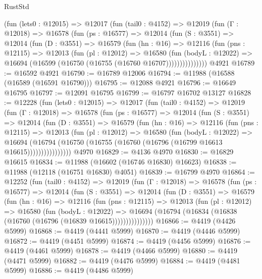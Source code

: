 \begin{lexlean}{RustStd}
\begin{coremodule}
      (fun (lets0 : @12015) =>
      @12017
        (fun (tail0 : @4152) =>
        @12019
          (fun (Γ : @12018) =>
          @16578
            (fun (ps : @16577) =>
            @12014
              (fun (S : @3551) =>
              @12014
                (fun (D : @3551) =>
                @16579
                  (fun (hn : @16) =>
                  @12116
                    (fun (pns : @12115) =>
                    @12013
                      (fun (pl : @12012) =>
                      @16580
                        (fun (bodyL : @12022) =>
                        @16694 (@16599 (@16750 (@16755 (@16760 @16707)))))))))))))))
    @4921
@16789 := @16592 @4921
@16790 := @16789 @12006
@16794 := @11988 (@16588 (@16589 (@16591 @16790)))
@16795 := @12088 @4921
@16796 := @16649 @16795
@16797 := @12091 @16795
@16799 := @16797 @16702 @13127
@16828 := @12228
    (fun (lets0 : @12015) =>
    @12017
      (fun (tail0 : @4152) =>
      @12019
        (fun (Γ : @12018) =>
        @16578
          (fun (ps : @16577) =>
          @12014
            (fun (S : @3551) =>
            @12014
              (fun (D : @3551) =>
              @16579
                (fun (hn : @16) =>
                @12116
                  (fun (pns : @12115) =>
                  @12013
                    (fun (pl : @12012) =>
                    @16580
                      (fun (bodyL : @12022) =>
                      @16694
                        (@16794
                          (@16750 (@16755 (@16760 (@16796 (@16799 @16613 @16615))))))))))))))))
    @4970
@16829 := @4136 @4970
@16830 := @16829 @16615
@16834 := @11988 (@16602 (@16746 @16830) @16623)
@16838 := @11988 (@12118 (@16751 @16830) @4051)
@16839 := @16799 @4970
@16864 := @12252
    (fun (tail0 : @4152) =>
    @12019
      (fun (Γ : @12018) =>
      @16578
        (fun (ps : @16577) =>
        @12014
          (fun (S : @3551) =>
          @12014
            (fun (D : @3551) =>
            @16579
              (fun (hn : @16) =>
              @12116
                (fun (pns : @12115) =>
                @12013
                  (fun (pl : @12012) =>
                  @16580
                    (fun (bodyL : @12022) =>
                    @16694 (@16794 (@16834 (@16838 (@16760 (@16796 (@16839 @16615)))))))))))))))
@16866 := @4419 (@4426 @5999)
@16868 := @4419 (@4441 @5999)
@16870 := @4419 (@4446 @5999)
@16872 := @4419 (@4451 @5999)
@16874 := @4419 (@4456 @5999)
@16876 := @4419 (@4461 @5999)
@16878 := @4419 (@4466 @5999)
@16880 := @4419 (@4471 @5999)
@16882 := @4419 (@4476 @5999)
@16884 := @4419 (@4481 @5999)
@16886 := @4419 (@4486 @5999)

\end{coremodule}
\end{lexlean}

